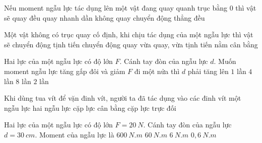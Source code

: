\begin{ex}%
Nếu moment ngẫu lực tác dụng lên một vật đang quay quanh trục bằng $0$ thì vật sẽ
\choice
{\True quay đều}
{quay nhanh dần}
{không quay}
{chuyển động thẳng đều}
\loigiai{}
\end{ex}
\begin{ex}%
Một vật không có trục quay cố định, khi chịu tác dụng của một ngẫu lực thì vật sẽ
\choice
{chuyển động tịnh tiến}
{\True chuyển động quay}
{vừa quay, vừa tịnh tiến}
{nằm cân bằng}
\loigiai{

}
\end{ex}
\begin{ex}%
Hai lực của một ngẫu lực có độ lớn $F$. Cánh tay đòn của ngẫu lực $d$. Muốn moment ngẫu lực tăng gấp đôi và giảm $F$ đi một nửa thì $d$ phải tăng lên
\choice
{$1$ lần}
{\True $4$ lần}
{$8$ lần}
{$2$ lần}
\loigiai{}
\end{ex}

\begin{ex}%
Khi dùng tua vít để vặn đinh vít, người ta đã tác dụng vào các đinh vít
\choice
{\True một ngẫu lực}
{hai ngẫu lực}
{cặp lực cân bằng}
{cặp lực trực đối}
\loigiai{}
\end{ex}

\begin{ex}%
\loigiai{}
\end{ex}
\begin{ex}%
Hai lực của một ngẫu lực có độ lớn $F=20 \ N$. Cánh tay đòn của ngẫu lực $d=30 \ cm$. Moment của ngẫu lực là
\choice
{$600\ N.m$}
{$60\ N.m$}
{\True $6\ N.m$}
{$0,6\ N.m$}
\loigiai{}
\end{ex}

